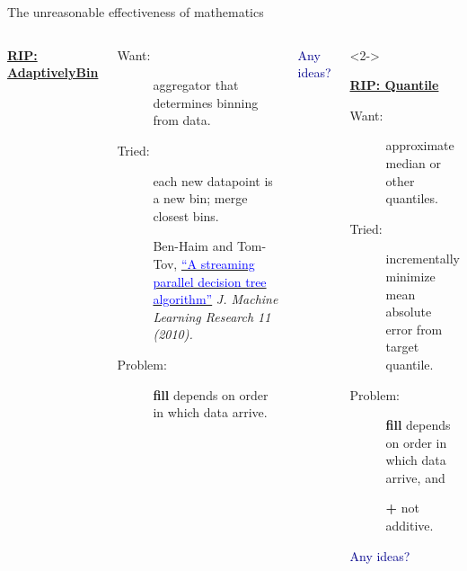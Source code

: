\documentclass[aspectratio=169]{beamer}
\begin{document}
\begin{frame}{The unreasonable effectiveness of mathematics}
\large
\begin{columns}
\begin{center}
\bf \underline{RIP: AdaptivelyBin}
\end{center}

\begin{description}
\item[Want:] aggregator that determines binning from data.

\item[Tried:] each new datapoint is a new bin; merge closest bins.

\vspace{0.25 cm}
\begin{minipage}{\linewidth}
\scriptsize Ben-Haim and Tom-Tov, \href{http://www.jmlr.org/papers/volume11/ben-haim10a/ben-haim10a.pdf}{\textcolor{blue}{``A streaming parallel decision tree algorithm''}} {\it J. Machine Learning Research 11 (2010).}
\end{minipage}

\item[Problem:] {\ttfamily\small\textbf{fill}} depends on order in which data arrive.
\end{description}

\begin{center}
\textcolor{darkblue}{Any ideas?}
\end{center}

\begin{uncoverenv}<2->
\begin{center}
\bf \underline{RIP: Quantile}
\end{center}

\begin{description}
\item[Want:] approximate median or other quantiles.

\item[Tried:] incrementally minimize mean absolute error from target quantile.

\item[Problem:] {\ttfamily\small\textbf{fill}} depends on order in which data arrive, and

{\ttfamily\small\textbf{+}} not additive.
\end{description}

\begin{center}
\textcolor{darkblue}{Any ideas?}
\end{center}
\end{uncoverenv}
\end{columns}
\end{frame}
\end{document}
